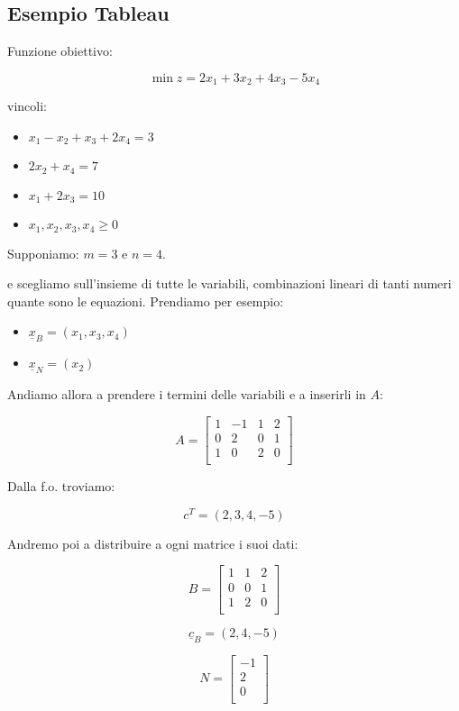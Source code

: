 \subsection{Esempio Tableau}

Funzione obiettivo:

$$\min z = 2x_1 + 3x_2 + 4x_3 - 5x_4$$

vincoli:

\begin{itemize}
	\item $x_1 - x_2 + x_3 + 2x_4 = 3$
	\item $2x_2 + x_4 = 7$
	\item $x_1 + 2x_3 = 10$
	\item $x_1, x_2, x_3, x_4 \geq 0$
\end{itemize}

Supponiamo: $m = 3$ e $n = 4$.

e scegliamo sull'insieme di tutte le variabili, combinazioni lineari di tanti numeri quante sono le equazioni. Prendiamo per esempio:

\begin{itemize}
	\item $\underline{x}_B = (x_1, x_3, x_4)$
	\item $\underline{x}_N = (x_2)$
\end{itemize}

Andiamo allora a prendere i termini delle variabili e a inserirli in $A$:

$$A =
\left[ {\begin{array}{cccc}
	1 & -1 & 1 & 2\\
	0 & 2 & 0 & 1\\
	1 & 0 & 2 & 0\\
\end{array} } \right]
$$

Dalla f.o. troviamo:

$$c^T = (2, 3, 4, -5)$$

Andremo poi a distribuire a ogni matrice i suoi dati:

$$B =
\left[ {\begin{array}{ccc}
	1 & 1 & 2 \\
	0 & 0 & 1 \\
	1 & 2 & 0 \\
\end{array} } \right]
$$

$$\underline{c}_B = (2, 4, -5)$$

$$N =
\left[ {\begin{array}{c}
	-1 \\
	2 \\
	0 \\
\end{array} } \right]
$$

